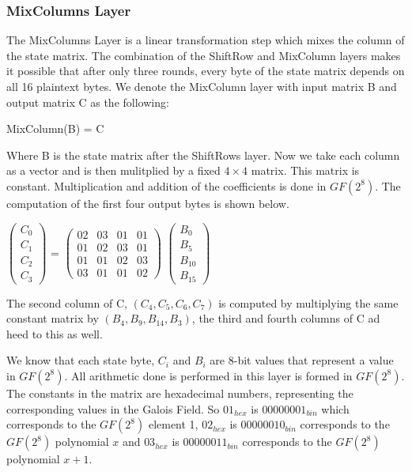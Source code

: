 \subsubsection{MixColumns Layer}

The MixColumns Layer is a linear transformation step which mixes the column of the state matrix. The combination of the ShiftRow and MixColumn layers makes it possible that after only three rounds, every byte of the state matrix depends on all 16 plaintext bytes. We denote the MixColumn layer with input matrix B and output matrix C as the following:

\begin{center}
MixColumn(B) = C
\end{center}

Where B is the state matrix after the ShiftRows layer. Now we take each column as a vector and is then mulitplied by a fixed $4 \times 4$ matrix. This matrix is constant. Multiplication and addition of the coefficients is done in $GF(2^8)$. The computation of the first four output bytes is shown below.
\begin{center}
$
\begin{pmatrix}
C_0 \\
C_1 \\
C_2 \\
C_3
\end{pmatrix} 
$
=
$
\begin{pmatrix}
02 & 03 & 01 & 01 \\
01 & 02 & 03 & 01 \\
01 & 01 & 02 & 03 \\
03 & 01 & 01 & 02
\end{pmatrix}
$
$
\begin{pmatrix}
B_0 \\
B_5 \\
B_{10} \\
B_{15} 
\end{pmatrix}
$
\end{center}

The second column of C, $(C_4, C_5, C_6, C_7)$ is computed by multiplying the same constant matrix by $(B_4, B_9, B_{14}, B_3)$, the third and fourth columns of C ad heed to this as well. 

We know that each state byte, $C_i$ and $B_i$ are 8-bit values that represent a value in $GF(2^8)$. All arithmetic done is performed in this layer is formed in $GF(2^8)$. The constants in the matrix are hexadecimal numbers, representing the corresponding values in the Galois Field. So $01_{hex}$ is $00000001_{bin}$ which corresponds to the $GF(2^8)$ element 1, $02_{hex}$ is $00000010_{bin}$ corresponds to the $GF(2^8)$ polynomial $x$ and $03_{hex}$ is $00000011_{bin}$ corresponds to the $GF(2^8)$ polynomial $x+1$. 

